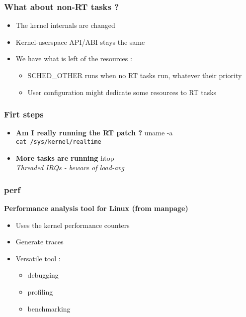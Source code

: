 \begin{frame}
	\frametitle{What about non-RT tasks ?}
	\begin{itemize}
		\item The kernel internals are changed
		\item Kernel-userspace API/ABI stays the same
		\item We have what is left of the resources :
			\begin{itemize}
				\item SCHED\_OTHER runs when no RT tasks run, whatever their priority
				\item User configuration might dedicate some resources to RT tasks
			\end{itemize}
	\end{itemize}
\end{frame}

\begin{frame}
	\frametitle{Firt steps}
	\begin{itemize}
		\item \textbf{Am I really running the RT patch ?} uname -a \\ \small{\texttt{cat /sys/kernel/realtime}}
		\item \textbf{More tasks are running} htop \\ \small{\textit{Threaded IRQs - beware of load-avg}}
	\end{itemize}
\end{frame}

\begin{frame}
	\frametitle{perf}
	\textbf{Performance analysis tool for Linux (from manpage)}
	\begin{itemize}
		\item Uses the kernel performance counters
		\item Generate traces
		\item Versatile tool :
			\begin{itemize}
				\item debugging
				\item profiling
				\item benchmarking
			\end{itemize}
	\end{itemize}
\end{frame}

